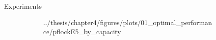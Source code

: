 \documentclass{beamer}
\begin{document}
\begin{frame}{Experiments}
\begin{figure}
\begin{subfigure}[t]{0.32\textwidth}
{                {../thesis/chapter4/figures/plots/01_optimal_performance/pflockE5_by_capacity}}
            \end{subfigure}
            \hfill
            \begin{subfigure}[t]{0.32\textwidth}
            \end{subfigure}
            \begin{subfigure}[t]{0.32\textwidth}
\end{subfigure}
\end{figure}
\end{frame}
\end{document}
